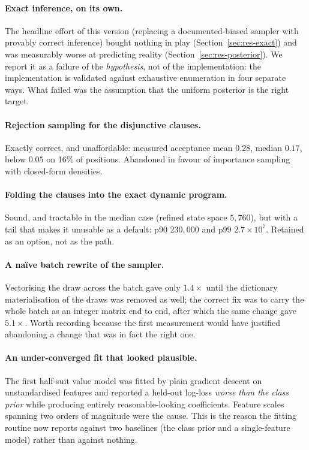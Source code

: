 \documentclass[11pt,letterpaper]{article}
\begin{document}
\paragraph{Exact inference, on its own.} The headline effort of this version
(replacing a documented-biased sampler with provably correct inference) bought
nothing in play (Section~\ref{sec:res-exact}) and was measurably worse at
predicting reality (Section~\ref{sec:res-posterior}). We report it as a failure
of the \emph{hypothesis}, not of the implementation: the implementation is
validated against exhaustive enumeration in four separate ways. What failed was
the assumption that the uniform posterior is the right target.

\paragraph{Rejection sampling for the disjunctive clauses.} Exactly correct, and
unaffordable: measured acceptance mean $0.28$, median $0.17$, below $0.05$ on
16\% of positions. Abandoned in favour of importance sampling with closed-form
densities.

\paragraph{Folding the clauses into the exact dynamic program.} Sound, and
tractable in the median case (refined state space $5{,}760$), but with a tail
that makes it unusable as a default: p90 $230{,}000$ and p99
$2.7 \times 10^{7}$. Retained as an option, not as the path.

\paragraph{A na\"ive batch rewrite of the sampler.} Vectorising the draw across
the batch gave only $1.4\times$ until the dictionary materialisation of the
draws was removed as well; the correct fix was to carry the whole batch as an
integer matrix end to end, after which the same change gave $5.1\times$. Worth
recording because the first measurement would have justified abandoning a
change that was in fact the right one.

\paragraph{An under-converged fit that looked plausible.} The first half-suit
value model was fitted by plain gradient descent on unstandardised features and
reported a held-out log-loss \emph{worse than the class prior} while producing
entirely reasonable-looking coefficients. Feature scales spanning two orders of
magnitude were the cause. This is the reason the fitting routine now reports
against two baselines (the class prior and a single-feature model) rather than
against nothing.
\end{document}

